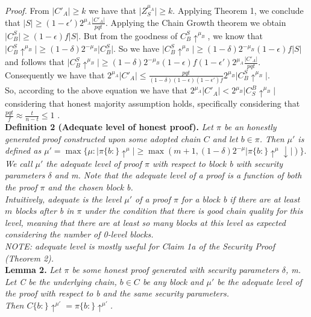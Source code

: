 \textit{Proof.} From $\vert C'_A \vert \geq k$ we have that $\vert Z^{\mu_A}_S \vert \geq k$. Applying Theorem 1, we conclude that $\vert S \vert \geq (1-\epsilon')2^{\mu_A} \frac{\vert C'_A \vert}{pqt}$. Applying the Chain Growth theorem \cite{Backbone} we obtain $\vert C_{B}^S \vert \geq (1 - \epsilon)f \vert S \vert$. But from the goodness of $C_{B}^S \uparrow^{\mu_B}$, we know that $\vert C_{B}^S\uparrow^{\mu_B} \vert \geq (1 - \delta)2^{-\mu_B} \vert C_{B}^S \vert $. So we have $\vert C_{B}^S\uparrow^{\mu_B} \vert \geq (1 - \delta)2^{-\mu_B} (1 - \epsilon)f \vert S \vert $ and follows that $\vert C_{B}^S\uparrow^{\mu_B} \vert \geq (1 - \delta)2^{-\mu_B} (1 - \epsilon)f (1-\epsilon')2^{\mu_A} \frac{\vert C'_A \vert}{pqt} $. Consequently we have that $2^{\mu_A} \vert C'_A \vert \leq \frac{pqt}{(1- \delta)(1-\epsilon)(1-\epsilon')f} 2^{\mu_B} \vert C_{B}^S\uparrow^{\mu_B} \vert $.   \\

So, according to the above equation we have that $2^{\mu_A} \vert C'_A \vert <  2^{\mu_B} \vert    C^{B}_{S}\uparrow^{\mu_B}\vert $ considering that honest  majority assumption holds, specifically considering that $ \frac{pqt}{f} \approx \frac{t}{n-t} \leq 1 $ .\\

\textbf{Definition 2 (Adequate level of honest proof).} \textit{Let $\pi$ be an honestly generated proof constructed upon some adopted chain $C$ and let $b \in \pi $. Then $\mu'$ is defined as $\mu' = \max \{ \mu: \vert \pi\{b:\}\uparrow^{\mu} \vert \geq \max( m+1, (1-\delta)2^{-\mu} \vert \pi\{b:\}\uparrow^{\mu}\downarrow \vert )   \}$}.
\textit{We call $\mu'$ the adequate level of proof $\pi$ with respect to block b with security parameters $\delta$ and m. Note that the adequate level of a proof is a function of both the proof $\pi$ and the chosen block b.}\\

\textit{Intuitively, adequate is the level $\mu'$ of a proof $\pi$ for a block b if there are at least $m$ blocks after b in $\pi$ under the condition that there is good chain quality for this level, meaning that there are at least so many blocks at this level as expected considering the number of 0-level blocks.\\ 
NOTE: adequate level is mostly useful for Claim 1a of the Security Proof (Theorem 2).}\\

\textbf{Lemma 2.} \textit{Let $\pi$ be some honest proof generated with security parameters $\delta$, m. Let C be the underlying chain, $b \in C$ be any block and $\mu'$ be the adequate level of the proof with respect to b and the same security parameters.\\Then $C\{b:\}\uparrow^{\mu'} = \pi\{b:\}\uparrow^{\mu'}$.}\\

